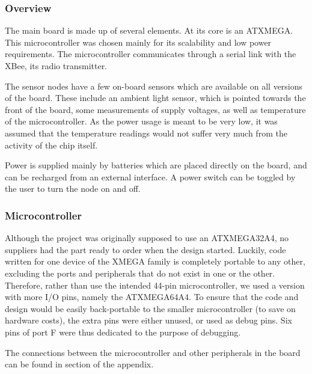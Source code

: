 \subsubsection{Overview}

The main board is made up of several elements. At its core is an ATXMEGA. This
microcontroller was chosen mainly for its scalability and low power
requirements. The microcontroller communicates through a serial link with the
XBee, its radio transmitter.

The sensor nodes have a few on-board sensors which are available on all versions
of the board. These include an ambient light sensor, which is pointed towards
the front of the board, some measurements of supply voltages, as well as
temperature of the microcontroller. As the power usage is meant to be very low,
it was assumed that the temperature readings would not suffer very much from
the activity of the chip itself.

Power is supplied mainly by batteries which are placed directly on the board,
and can be recharged from an external interface. A power switch can be toggled
by the user to turn the node on and off.

\subsubsection{Microcontroller}

Although the project was originally supposed to use an ATXMEGA32A4, no suppliers
had the part ready to order when the design started. Luckily, code written for
one device of the XMEGA family is completely portable to any other, excluding
the ports and peripherals that do not exist in one or the other. Therefore,
rather than use the intended 44-pin microcontroller, we used a version with more
I/O pins, namely the ATXMEGA64A4. To ensure that the code and design would be
easily back-portable to the smaller microcontroller (to save on hardware costs),
the extra pins were either unused, or used as debug pins. Six pins of port F
were thus dedicated to the purpose of debugging. 

The connections between the microcontroller and other peripherals in the board
can be found in section  of the appendix.


